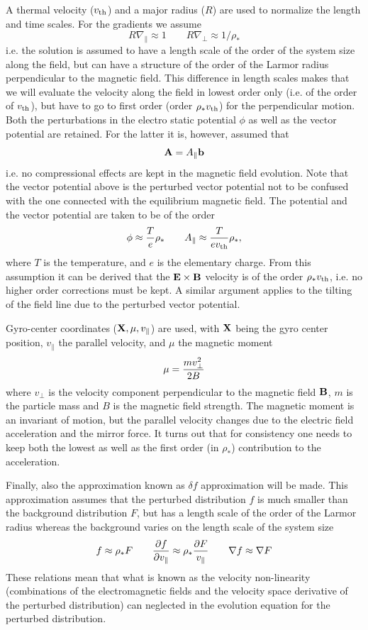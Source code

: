 \documentclass{report}
\def\be{\begin{equation}}
\def\ee{\end{equation}}
\begin{document}
A thermal velocity ($v_{\rm th}$) and a major radius ($R$) are used to normalize the length and 
time scales. For the gradients we assume 
\be 
R \nabla_\parallel  \approx 1 \qquad 
R \nabla_\perp \approx 1/ \rho_*
\ee 
i.e. the solution is assumed to have a length scale of the order of the system size along the 
field, but can have a structure of the order of the Larmor radius perpendicular to the 
magnetic field. This difference in length scales makes that we will evaluate the velocity 
along the field in lowest order only (i.e. of the order of $v_{\rm th}$), but have to go to 
first order (order $\rho_* v_{\rm th}$) for the perpendicular motion. Both the perturbations in 
the electro static potential $\phi$ as well as the vector potential are retained. For the 
latter it is, however, assumed that 
\be 
{\bf A} = A_\parallel {\bf b} 
\ee
i.e. no compressional effects are kept in the magnetic field evolution. 
Note that the vector potential above is the perturbed vector potential not to be confused 
with the one connected with the equilibrium magnetic field. 
The potential and the vector potential are taken to be of the order 
\be 
\phi \approx {T \over e} \rho_* \qquad 
A_\parallel \approx {T \over e v_{\rm th}} \rho_* , 
\ee
where $T$ is the temperature, and $e$ is the elementary charge.  
From this assumption it can be derived that the ${\bf E} \times {\bf B}$ velocity is of the order $\rho_* v_{\rm th}$, 
i.e. no higher order corrections must be kept. A similar argument applies to the tilting of 
the field line due to the perturbed vector potential. 

Gyro-center coordinates (${\bf X},\mu,v_\parallel$) are used, with ${\bf X}$ being the gyro
center position, $v_\parallel$ the parallel velocity, and $\mu$ the magnetic moment 
\be 
\mu = {m v_\perp^2 \over 2 B} 
\ee 
where $v_\perp$ is the velocity component perpendicular to the magnetic field ${\bf B}$, $m$
is the particle mass and $B$ is the magnetic field strength. The magnetic moment is an 
invariant of motion, but the parallel velocity changes due to the electric field acceleration 
and the mirror force. It turns out that for consistency one needs to keep both the lowest 
as well as the first order (in $\rho_*$) contribution to the acceleration. 

Finally, also the approximation known as $\delta f$ approximation will be made. This approximation
assumes that the perturbed distribution $f$ is much smaller than the background distribution 
$F$, but has a length scale of the order of the Larmor radius whereas the background varies 
on the length scale of the system size 
\be 
f \approx \rho_* F \qquad 
{\partial f \over \partial v_\parallel} \approx \rho_* {\partial F \over v_\parallel}  \qquad 
\nabla f \approx \nabla F 
\ee
These relations mean that what is known as the velocity non-linearity (combinations of the 
electromagnetic fields and the velocity space derivative of the perturbed distribution) can
neglected in the evolution equation for the perturbed distribution.  
\end{document}
